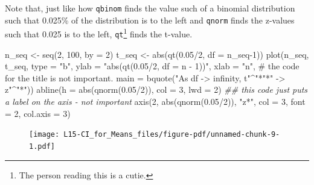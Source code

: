 \documentclass[
  letterpaper,
  DIV=11,
  numbers=noendperiod,
  oneside]{scrreprt}
\newenvironment{Shaded}{\begin{snugshade}}{\end{snugshade}}
\newcommand{\AttributeTok}[1]{\textcolor[rgb]{0.40,0.45,0.13}{#1}}
\newcommand{\CommentTok}[1]{\textcolor[rgb]{0.37,0.37,0.37}{#1}}
\newcommand{\DecValTok}[1]{\textcolor[rgb]{0.68,0.00,0.00}{#1}}
\newcommand{\DocumentationTok}[1]{\textcolor[rgb]{0.37,0.37,0.37}{\textit{#1}}}
\newcommand{\FloatTok}[1]{\textcolor[rgb]{0.68,0.00,0.00}{#1}}
\newcommand{\FunctionTok}[1]{\textcolor[rgb]{0.28,0.35,0.67}{#1}}
\newcommand{\NormalTok}[1]{\textcolor[rgb]{0.00,0.23,0.31}{#1}}
\newcommand{\OtherTok}[1]{\textcolor[rgb]{0.00,0.23,0.31}{#1}}
\newcommand{\SpecialCharTok}[1]{\textcolor[rgb]{0.37,0.37,0.37}{#1}}
\newcommand{\StringTok}[1]{\textcolor[rgb]{0.13,0.47,0.30}{#1}}
\begin{document}
Note that, just like how \texttt{qbinom} finds the value such of a
binomial distribution such that 0.025\% of the distribution is to the
left and \texttt{qnorm} finds the z-values such that 0.025 is to the
left, \texttt{qt}\footnote{The person reading this is a cutie.} finds
the t-value.

\begin{Shaded}
\begin{Highlighting}[]
\NormalTok{n\_seq }\OtherTok{\textless{}{-}} \FunctionTok{seq}\NormalTok{(}\DecValTok{2}\NormalTok{, }\DecValTok{100}\NormalTok{, }\AttributeTok{by =} \DecValTok{2}\NormalTok{)}
\NormalTok{t\_seq }\OtherTok{\textless{}{-}} \FunctionTok{abs}\NormalTok{(}\FunctionTok{qt}\NormalTok{(}\FloatTok{0.05}\SpecialCharTok{/}\DecValTok{2}\NormalTok{, }\AttributeTok{df =}\NormalTok{ n\_seq}\DecValTok{{-}1}\NormalTok{))}
\FunctionTok{plot}\NormalTok{(n\_seq, t\_seq, }\AttributeTok{type =} \StringTok{"b"}\NormalTok{,}
    \AttributeTok{ylab =} \StringTok{"abs(qt(0.05/2, df = n {-} 1))"}\NormalTok{,}
    \AttributeTok{xlab =} \StringTok{"n"}\NormalTok{,}
    \CommentTok{\# the code for the title is not important.}
    \AttributeTok{main =} \FunctionTok{bquote}\NormalTok{(}\StringTok{"As df {-}\textgreater{} infinity, t"}\SpecialCharTok{\^{}}\StringTok{"*"}\SpecialCharTok{*}\StringTok{" {-}\textgreater{} z"}\SpecialCharTok{\^{}}\StringTok{"*"}\NormalTok{))}
\FunctionTok{abline}\NormalTok{(}\AttributeTok{h =} \FunctionTok{abs}\NormalTok{(}\FunctionTok{qnorm}\NormalTok{(}\FloatTok{0.05}\SpecialCharTok{/}\DecValTok{2}\NormalTok{)), }\AttributeTok{col =} \DecValTok{3}\NormalTok{, }\AttributeTok{lwd =} \DecValTok{2}\NormalTok{)}
\DocumentationTok{\#\# this code just puts a label on the axis {-} not important}
\FunctionTok{axis}\NormalTok{(}\DecValTok{2}\NormalTok{, }\FunctionTok{abs}\NormalTok{(}\FunctionTok{qnorm}\NormalTok{(}\FloatTok{0.05}\SpecialCharTok{/}\DecValTok{2}\NormalTok{)), }\StringTok{"z*"}\NormalTok{, }\AttributeTok{col =} \DecValTok{3}\NormalTok{, }\AttributeTok{font =} \DecValTok{2}\NormalTok{, }\AttributeTok{col.axis =} \DecValTok{3}\NormalTok{)}
\end{Highlighting}
\end{Shaded}

\begin{figure}[H]

{\centering \texttt{[image: L15-CI\_for\_Means\_files/figure-pdf/unnamed-chunk-9-1.pdf]}

}

\end{figure}
\end{document}
